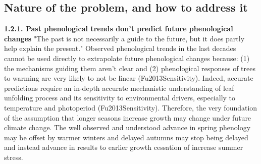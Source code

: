 \documentclass{article}
\begin{document}
\subsection{Nature of the problem, and how to address it}

\textbf{1.2.1. Past phenological trends don't predict future phenological changes}
"The past is not necessarily a guide to the future, but it does partly help explain the present."
Observed phenological trends in the last decades cannot be used directly to extrapolate future phenological changes because: (1) the mechanisms guiding them aren't clear and (2) phenological responses of trees to warming are very likely to not be linear (Fu2013Sensitivity). Indeed, accurate predictions require an in-depth accurate mechanistic understanding of leaf unfolding process and its sensitivity to environmental drivers, especially to temperature and photoperiod (Fu2013Sensitivity). Therefore, the very foundation of the assumption that longer seasons increase growth may change under future climate change. The well observed and understood advance in spring phenology may be offset by warmer winters and delayed autumns may stop being delayed and instead advance in results to earlier growth cessation of increase summer stress. 
\end{document}
